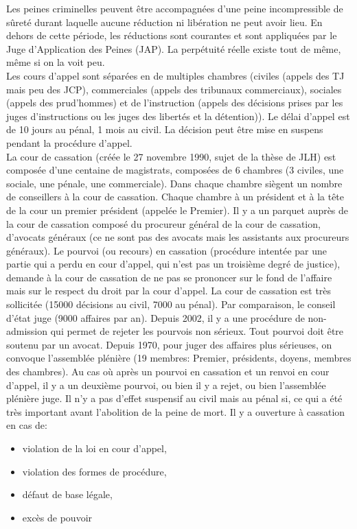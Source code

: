 \documentclass[math]{cours}
\begin{document}
	Les peines criminelles peuvent être accompagnées d'une peine incompressible de sûreté durant laquelle aucune réduction ni libération ne peut avoir lieu.
	En dehors de cette période, les réductions sont courantes et sont appliquées par le Juge d'Application des Peines (JAP).
	La perpétuité réelle existe tout de même, même si on la voit peu.\\
	Les cours d'appel sont séparées en de multiples chambres (civiles (appels des TJ mais peu des JCP), commerciales (appels des tribunaux commerciaux), sociales (appels des prud'hommes) et de l'instruction (appels des décisions prises par les juges d'instructions ou les juges des libertés et la détention)).
	Le délai d'appel est de 10 jours au pénal, 1 mois au civil.
	La décision peut être mise en suspens pendant la procédure d'appel.\\
	La cour de cassation (créée le 27 novembre 1990, sujet de la thèse de JLH) est composée d'une centaine de magistrats, composées de 6 chambres (3 civiles, une sociale, une pénale, une commerciale).
	Dans chaque chambre siègent un nombre de conseillers à la cour de cassation.
	Chaque chambre à un président et à la tête de la cour un premier président (appelée le Premier).
	Il y a un parquet auprès de la cour de cassation composé du procureur général de la cour de cassation, d'avocats généraux (ce ne sont pas des avocats mais les assistants aux procureurs généraux).
	Le pourvoi (ou recours) en cassation (procédure intentée par une partie qui a perdu en cour d'appel, qui n'est pas un troisième degré de justice),
	demande à la cour de cassation de ne pas se prononcer sur le fond de l'affaire mais sur le respect du droit par la cour d'appel.
	La cour de cassation est très sollicitée (15000 décisions au civil, 7000 au pénal).
	Par comparaison, le conseil d'état juge (9000 affaires par an).
	Depuis 2002, il y a une procédure de non-admission qui permet de rejeter les pourvois non sérieux.
	Tout pourvoi doit être soutenu par un avocat.
	Depuis 1970, pour juger des affaires plus sérieuses, on convoque l'assemblée plénière (19 membres: Premier, présidents, doyens, membres des chambres).
	Au cas où après un pourvoi en cassation et un renvoi en cour d'appel, il y a un deuxième pourvoi, ou bien il y a rejet, ou bien l'assemblée plénière juge.
	Il n'y a pas d'effet suspensif au civil mais au pénal si, ce qui a été très important avant l'abolition de la peine de mort.
	Il y a ouverture à cassation en cas de:
	\begin{itemize}
		\item violation de la loi en cour d'appel,
		\item violation des formes de procédure,
		\item défaut de base légale,
		\item excès de pouvoir
	\end{itemize}
\end{document}
